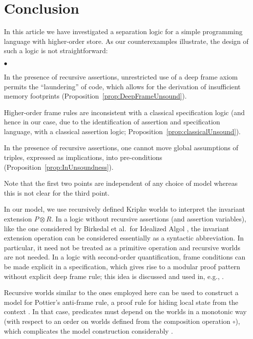 \documentclass{LMCS}
\theoremstyle{remark}
\begin{document}
 
 \section{Conclusion}


 In this article we have investigated a separation logic for a simple programming language with higher-order store. As our counterexamples illustrate, the design of such a logic is not straightforward: 
 \begin{iteMize}{$\bullet$}
 \item  In the presence of recursive assertions, unrestricted use of a deep frame axiom permits the ``laundering'' of code, which allows for the derivation of insufficient memory footprints (Proposition~\ref{prop:DeepFrameUnsound}).
\item Higher-order frame rules are inconsistent with a classical
specification logic (and hence in our case, due to the identification of assertion and specification language, with a classical assertion logic; Proposition~\ref{prop:classicalUnsound}).
 \item In the presence of recursive assertions, one cannot move global  assumptions of triples, expressed as implications, into pre-conditions
 (Proposition~\ref{prop:InUnsoundness}).
 \end{iteMize}
Note that the first two points are  independent  of any choice of model whereas this is not clear for the third point.

In our model, we use recursively defined Kripke worlds to interpret the invariant extension $P\otimes R$. 
In a logic without recursive assertions (and assertion variables), like the one considered by Birkedal et al.\ for Idealized Algol \cite{BirkedalL:semslt-lmcs}, the invariant extension operation can be considered essentially as a syntactic abbreviation. In particular, it need not be treated as a primitive operation and recursive worlds are not needed. 
In a logic with second-order quantification, frame conditions can be made explicit in a specification, which gives rise to a modular proof pattern without explicit deep frame rule; this idea is discussed and used in, e.g., \cite{Benton:06,CharltonReusLola10}. 

Recursive worlds similar to the ones employed here can be used to construct a model for Pottier's anti-frame rule, a proof rule for hiding local state from the context \cite{Pottier:08}. 
In that case, predicates must depend on the worlds in a {monotonic} way (with respect to an order on worlds defined from the composition operation $\circ$), which complicates the model construction considerably \cite{schwinghammerYBPR10,Schwinghammer:Birkedal:Stovring:11}. 
 
\end{document}
